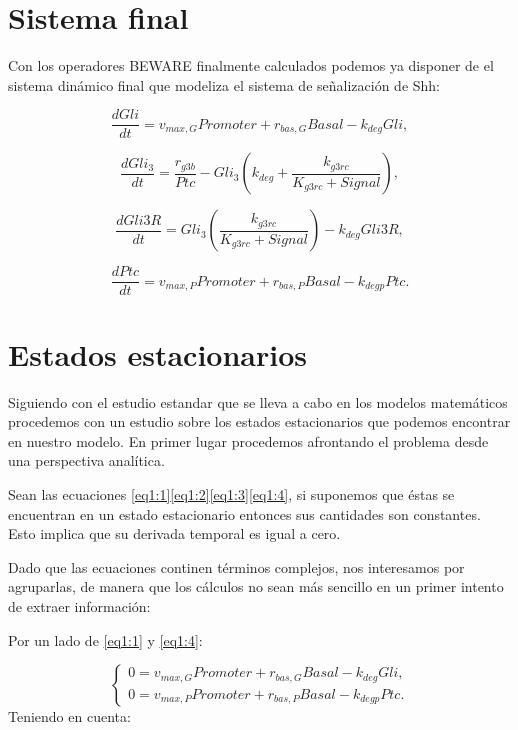    
\section{Sistema final}
 Con los operadores BEWARE finalmente calculados podemos ya disponer de el sistema dinámico final que modeliza el sistema de señalización de Shh:
 
 \begin{equation}
 \frac{dGli}{dt} = v_{max,G}Promoter+r_{bas,G}Basal-k_{deg}Gli,
 \label{eq1:1}
 \end{equation}
 
 \begin{equation}
 \frac{dGli_3}{dt} = \frac{r_{g3b}}{Ptc}-Gli_3\left(k_{deg}+\frac{k_{g3rc}}{K_{g3rc}+Signal}\right),
 \label{eq1:2}
 \end{equation}
 
 \begin{equation}
 \frac{dGli3R}{dt}= Gli_3\left(\frac{k_{g3rc}}{K_{g3rc}+Signal}\right)-k_{deg}Gli3R,
 \label{eq1:3}
 \end{equation}
 
 \begin{equation}
 \frac{dPtc}{dt} = v_{max,P}Promoter+r_{bas,P}Basal-k_{degp}Ptc.
 \label{eq1:4}
 \end{equation}
 
\section{Estados estacionarios}\label{apartado2.4}
Siguiendo con el estudio estandar que se lleva a cabo en los modelos matemáticos procedemos con un estudio sobre los estados estacionarios que podemos encontrar en nuestro modelo. En primer lugar procedemos afrontando el problema desde una perspectiva analítica. 

Sean las ecuaciones \ref{eq1:1}\ref{eq1:2}\ref{eq1:3}\ref{eq1:4}, si suponemos que éstas se encuentran en un estado estacionario entonces sus cantidades son constantes. Esto implica que su derivada temporal es igual a cero.

Dado que las ecuaciones continen términos complejos, nos interesamos por agruparlas, de manera que los cálculos no sean más sencillo en un primer intento de extraer información:

Por un lado de \ref{eq1:1} y \ref{eq1:4}:

$$\begin{cases} 0 = v_{max,G}Promoter+r_{bas,G}Basal-k_{deg}Gli, \\0= v_{max,P}Promoter+r_{bas,P}Basal-k_{degp}Ptc. \end{cases}$$
Teniendo en cuenta:

